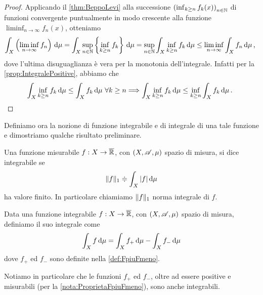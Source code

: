 \begin{proof}
	Applicando il \cref{thm:BeppoLevi} alla successione $\left(\inf_{k\ge n}f_k(x)\right)_{n\in\mathbb N}$ di funzioni convergente puntualmente in modo crescente alla funzione $\liminf_{n\to\infty}f_n(x)$, otteniamo
	\begin{equation*}
		\int_X\left(\liminf_{n\to\infty}f_n\right)\,\mathrm d\mu=\int_X \sup_{n\in\mathbb N}\left\{\inf_{k\ge n}f_k\right\}\,\mathrm d\mu=\sup_{n\in\mathbb N}\int_X \inf_{k\ge n}f_k\,\mathrm d\mu\le \liminf_{n\to\infty}\int_Xf_n\,\mathrm d\mu\, \text{, }
	\end{equation*}
	dove l'ultima disuguaglianza è vera per la monotonia dell'integrale. Infatti per la \cref{prop:IntegralePositive}, abbiamo che
	\begin{equation*}
		\int_X \inf_{k\ge n}f_k\,\mathrm d\mu\le \int_Xf_k\,\mathrm d\mu \ \forall k\ge n \Longrightarrow \int_X \inf_{k\ge n}f_k\,\mathrm d\mu\le \inf_{k\ge n}\int_Xf_k\,\mathrm d\mu\, \text{. }
	\end{equation*}
\end{proof}

Definiamo ora la nozione di funzione integrabile e di integrale di una tale funzione e dimostriamo qualche risultato preliminare.

\begin{definition}
	Una funzione misurabile $f:X\to\overline{\mathbb R}$, con $(X,\mathscr A,\mu)$ spazio di misura, si dice integrabile se 
	\begin{equation*}
		\Vert f\Vert_1\doteqdot \int_X |f|\,\mathrm d\mu
	\end{equation*}
	ha valore finito. In particolare chiamiamo $\Vert f\Vert_1$ norma integrale di $f$.
	
\end{definition}

\begin{definition}\label{def:IntegraleIntegrabili}
	Data una funzione integrabile $f:X\to\overline{\mathbb R}$, con $(X,\mathscr A,\mu)$ spazio di misura, definiamo il suo integrale come
	\begin{equation*}
		\int_X f\,\mathrm d\mu=\int_Xf_+\,\mathrm d\mu-\int_Xf_-\,\mathrm d\mu
	\end{equation*}
	dove $f_+$ ed $f_-$ sono definite nella \cref{def:FpiuFmeno}.
\end{definition}

\begin{remark}\label{nota:FpiuFmenoIntegrabili}
	Notiamo in particolare che le funzioni $f_+$ ed $f_-$, oltre ad essere positive e misurabili (per la \cref{nota:ProprietaFpiuFmeno}), sono anche integrabili.
\end{remark}

